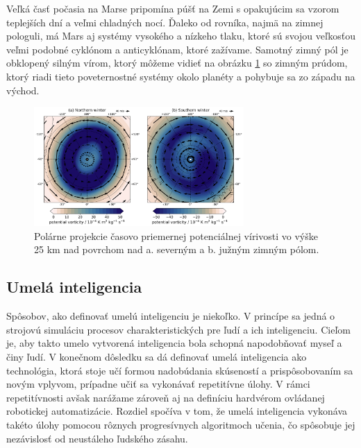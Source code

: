 Veľká časť počasia na Marse pripomína púšť na Zemi s opakujúcim sa vzorom teplejších dní a veľmi chladných nocí. Ďaleko od rovníka, najmä na zimnej pologuli, má Mars aj systémy vysokého a nízkeho tlaku, ktoré sú svojou veľkosťou veľmi podobné cyklónom a anticyklónam, ktoré zažívame. Samotný zimný pól je obklopený silným vírom, ktorý môžeme vidieť na obrázku \ref{circPolar} so zimným prúdom, ktorý riadi tieto poveternostné systémy okolo planéty a pohybuje sa zo západu na východ.

\begin{figure}[!htbp]
  \centering
  \includegraphics[width=8cm]{img/MARS_circulation_openMars_polar.png}
  \caption{Polárne projekcie časovo priemernej potenciálnej vírivosti vo výške 25 km nad povrchom nad a. severným a b. južným zimným pólom.}
  \label{circPolar}
\end{figure}

\subsection{Umelá inteligencia}
Spôsobov, ako definovať umelú inteligenciu je niekoľko. V princípe sa jedná o strojovú simuláciu procesov charakteristických pre ľudí a ich inteligenciu. Cieľom je, aby takto umelo vytvorená inteligencia bola schopná napodobňovať myseľ a činy ľudí. V konečnom dôsledku sa dá definovať umelá inteligencia ako technológia, ktorá stoje učí formou nadobúdania skúseností a prispôsobovaním sa novým vplyvom, prípadne učiť sa vykonávať repetitívne úlohy. V rámci repetitívnosti avšak narážame zároveň aj na definíciu hardvérom ovládanej robotickej automatizácie. Rozdiel spočíva v tom, že umelá inteligencia vykonáva takéto úlohy pomocou rôznych progresívnych algoritmoch učenia, čo spôsobuje jej nezávislosť od neustáleho ľudského zásahu.

